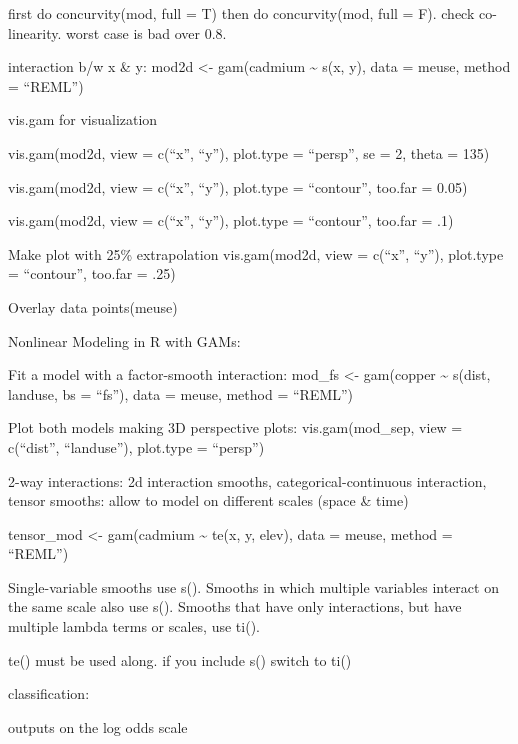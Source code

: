 \documentclass[]{book}
\begin{document}
first do concurvity(mod, full = T) then do concurvity(mod, full = F). check co-linearity. worst case is bad over 0.8.

interaction b/w x \& y: mod2d \textless{}- gam(cadmium \textasciitilde{} s(x, y), data = meuse, method = ``REML'')

vis.gam for visualization

vis.gam(mod2d, view = c(``x'', ``y''),
plot.type = ``persp'', se = 2, theta = 135)

vis.gam(mod2d, view = c(``x'', ``y''),
plot.type = ``contour'', too.far = 0.05)

vis.gam(mod2d, view = c(``x'', ``y''), plot.type = ``contour'', too.far = .1)

Make plot with 25\% extrapolation
vis.gam(mod2d, view = c(``x'', ``y''),
plot.type = ``contour'', too.far = .25)

Overlay data
points(meuse)

Nonlinear Modeling in R with GAMs:

Fit a model with a factor-smooth interaction:
mod\_fs \textless{}- gam(copper \textasciitilde{} s(dist, landuse, bs = ``fs''), data = meuse, method = ``REML'')

Plot both models making 3D perspective plots:
vis.gam(mod\_sep, view = c(``dist'', ``landuse''), plot.type = ``persp'')

2-way interactions: 2d interaction smooths, categorical-continuous interaction, tensor smooths: allow to model on different scales (space \& time)

tensor\_mod \textless{}- gam(cadmium \textasciitilde{} te(x, y, elev), data = meuse, method = ``REML'')

Single-variable smooths use s().
Smooths in which multiple variables interact on the same scale also use s().
Smooths that have only interactions, but have multiple lambda terms or scales, use ti().

te() must be used along. if you include s() switch to ti()

classification:

outputs on the log odds scale
\end{document}
